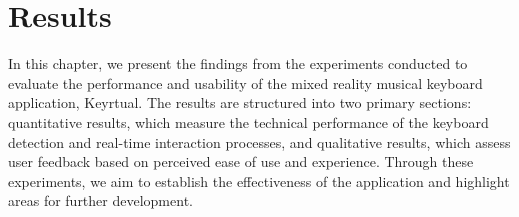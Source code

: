 \chapter{Results}\label{ch:results}
In this chapter, we present the findings from the experiments conducted to evaluate the performance
and usability of the mixed reality musical keyboard application, Keyrtual.
The results are structured into two primary sections: quantitative results, which measure the technical performance
of the keyboard detection and real-time interaction processes, and qualitative results,
which assess user feedback based on perceived ease of use and experience.
Through these experiments, we aim to establish the effectiveness of the application
and highlight areas for further development.




